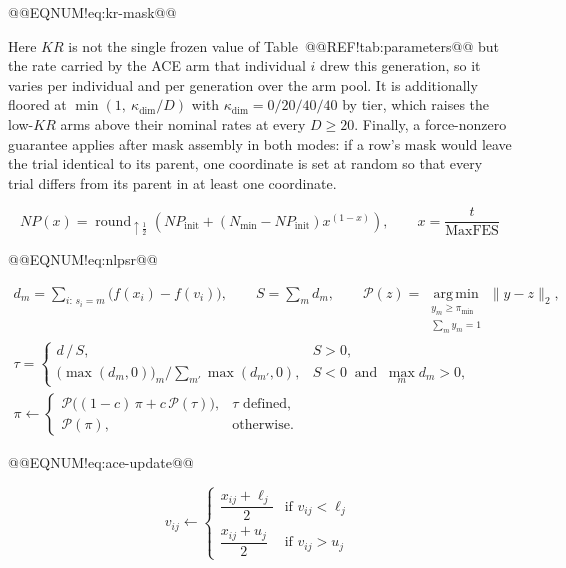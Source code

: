 \documentclass[10pt,a4paper]{article}
\begin{document}
@@EQNUM!eq:kr-mask@@

Here $KR$ is not the single frozen value of Table~@@REF!tab:parameters@@ but the rate carried by the ACE arm that individual $i$ drew this generation, so it varies per individual and per generation over the arm pool. It is additionally floored at $\min(1,\ \kappa_{\dim}/D)$ with $\kappa_{\dim}=0/20/40/40$ by tier, which raises the low-$KR$ arms above their nominal rates at every $D\ge20$. Finally, a force-nonzero guarantee applies after mask assembly in both modes: if a row's mask would leave the trial identical to its parent, one coordinate is set at random so that every trial differs from its parent in at least one coordinate.




\[
NP(x) = \operatorname{round}_{\uparrow\frac12}\!\left(
NP_{\text{init}} + \left(N_{\min} - NP_{\text{init}}\right) x^{(1-x)}
\right),
\qquad x = \frac{t}{\text{MaxFES}}
\]

@@EQNUM!eq:nlpsr@@











\[
\begin{gathered}
d_m = \!\!\sum_{i:\,s_i = m}\!\! \bigl(f(x_i) - f(v_i)\bigr),
\qquad
S = \sum_{m} d_m,
\qquad
\mathcal{P}(z) = \operatorname*{arg\,min}_{\substack{y_m \ge \pi_{\min}\\ \sum_{m} y_m = 1}} \lVert y - z \rVert_2,
\\[4pt]
\tau =
\begin{cases}
d \,/\, S, & S > 0,\\[2pt]
\bigl(\max(d_m,0)\bigr)_m \Big/ \sum_{m'}\max(d_{m'},0), & S < 0 \ \text{ and } \ \max_m d_m > 0,
\end{cases}
\\[4pt]
\pi \leftarrow
\begin{cases}
\mathcal{P}\bigl((1-c)\,\pi + c\,\mathcal{P}(\tau)\bigr), & \tau \text{ defined},\\[2pt]
\mathcal{P}(\pi), & \text{otherwise.}
\end{cases}
\end{gathered}
\]

@@EQNUM!eq:ace-update@@





\[
v_{ij} \leftarrow
\begin{cases}
\dfrac{x_{ij} + \ell_j}{2} & \text{if } v_{ij} < \ell_j\\[6pt]
\dfrac{x_{ij} + u_j}{2} & \text{if } v_{ij} > u_j
\end{cases}
\]
\end{document}
